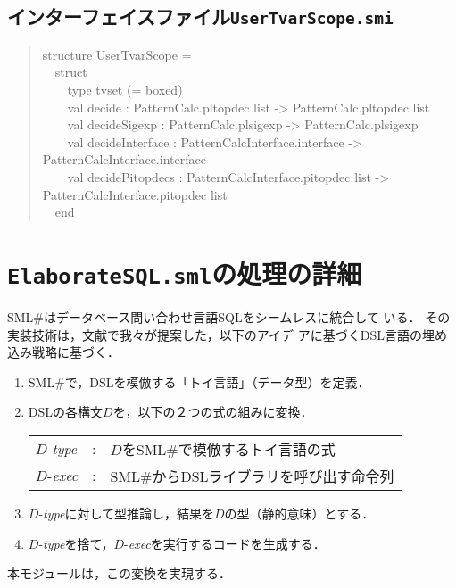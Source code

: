 \documentclass{jbook}
\newif\ifjp
\newcommand{\txt}[2]{#1}
\newcommand{\smlsharp}{SML\#}
\newcommand{\code}[1]{\mbox{\large\tt #1}}
\newcommand{\myem}{\mbox{\ \ }}
\newenvironment{program}{\begin{quote}\begin{tt}}%
                        {\end{tt}\end{quote}}
\begin{document}
\subsection{インターフェイスファイル\code{UserTvarScope.smi}}
\begin{program}
structure UserTvarScope =\\
\myem  struct\\
\myem\myem    type tvset (= boxed)\\
\myem\myem    val decide : PatternCalc.pltopdec list -> PatternCalc.pltopdec list\\
\myem\myem    val decideSigexp : PatternCalc.plsigexp -> PatternCalc.plsigexp\\
\myem\myem    val decideInterface : PatternCalcInterface.interface -> PatternCalcInterface.interface\\
\myem\myem    val decidePitopdecs :  PatternCalcInterface.pitopdec list -> PatternCalcInterface.pitopdec list\\
\myem  end
\end{program}
\else%
\fi%

\section{\txt{\code{ElaborateSQL.sml}の処理の詳細}{The details of \code{ElaborateSQL.sml}}}
\ifjp%

	\smlsharp{}はデータベース問い合わせ言語SQLをシームレスに統合して
いる\cite{ohor89sigmod,bune96tods,ohori11}．
	その実装技術は，文献\cite{ohori11}で我々が提案した，以下のアイデ
アに基づくDSL言語の埋め込み戦略に基づく．
{
\newcommand{\dtype}{\mbox{$D$-{\it type}}}
\newcommand{\dexec}{\mbox{$D$-{\it exec}}}
\begin{enumerate}
\item \smlsharp{}で，DSLを模倣する「トイ言語」（データ型）を定義．
\item DSLの各構文$D$を，以下の２つの式の組みに変換．
\\[1ex]
\begin{tabular}{lcl}
\dtype &:& $D$を\smlsharp{}で模倣するトイ言語の式
\\
\dexec &:& \smlsharp{}からDSLライブラリを呼び出す命令列
\end{tabular}
\item \dtype{}に対して型推論し，結果を$D$の型（静的意味）とする．
\item \dtype{}を捨て，\dexec{}を実行するコードを生成する．
\end{enumerate}
}
	本モジュールは，この変換を実現する．
\end{document}
